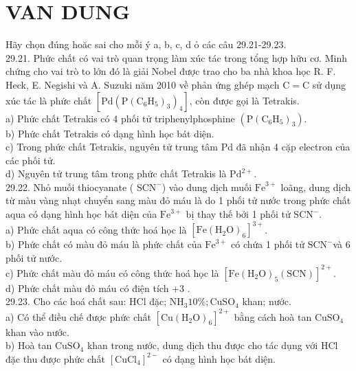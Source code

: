 \documentclass[10pt]{article}
\begin{document}
\section*{VAN DUNG}
Hãy chọn đúng hoăc sai cho mỗi ý a, b, c, d ỏ các câu 29.21-29.23.\\
29.21. Phức chất có vai trò quan trọng làm xúc tác trong tổng hợp hữu cơ. Minh chứng cho vai trò to lớn đó là giải Nobel được trao cho ba nhà khoa học R. F. Heck, E. Negishi và A. Suzuki năm 2010 về phản ứng ghép mạch $\mathrm{C}=\mathrm{C}$ sử dụng xúc tác là phức chất $\left[\mathrm{Pd}\left(\mathrm{P}\left(\mathrm{C}_{6} \mathrm{H}_{5}\right)_{3}\right)_{4}\right]$, còn được gọi là Tetrakis.\\
a) Phức chất Tetrakis có 4 phối tử triphenylphosphine $\left(\mathrm{P}\left(\mathrm{C}_{6} \mathrm{H}_{5}\right)_{3}\right)$.\\
b) Phức chất Tetrakis có dạng hình học bát diện.\\
c) Trong phức chất Tetrakis, nguyên tử trung tâm Pd đã nhận 4 cặp electron của các phối tử.\\
d) Nguyên tử trung tâm trong phức chất Tetrakis là $\mathrm{Pd}^{2+}$.\\
29.22. Nhỏ muối thiocyanate ( $\mathrm{SCN}^{-}$) vào dung dịch muối $\mathrm{Fe}^{3+}$ loãng, dung dịch từ màu vàng nhạt chuyển sang màu đỏ máu là do 1 phối tử nước trong phức chất aqua có dạng hình học bát diện của $\mathrm{Fe}^{3+}$ bị thay thế bởi 1 phối tử $\mathrm{SCN}^{-}$.\\
a) Phức chất aqua có công thức hoá học là $\left[\mathrm{Fe}\left(\mathrm{H}_{2} \mathrm{O}\right)_{6}\right]^{3+}$.\\
b) Phức chất có màu đỏ máu là phức chất của $\mathrm{Fe}^{3+}$ có chứa 1 phối tử $\mathrm{SCN}^{-}$và 6 phối tử nước.\\
c) Phức chất màu đỏ máu có công thức hoá học là $\left[\mathrm{Fe}\left(\mathrm{H}_{2} \mathrm{O}\right)_{5}(\mathrm{SCN})\right]^{2+}$.\\
d) Phức chất màu đỏ máu có điện tích +3 .\\
29.23. Cho các hoá chất sau: HCl đặc; $\mathrm{NH}_{3} 10 \% ; \mathrm{CuSO}_{4}$ khan; nước.\\
a) Có thể điều chế được phức chất $\left[\mathrm{Cu}\left(\mathrm{H}_{2} \mathrm{O}\right)_{6}\right]^{2+}$ bằng cách hoà tan $\mathrm{CuSO}_{4}$ khan vào nước.\\
b) Hoà tan $\mathrm{CuSO}_{4}$ khan trong nước, dung dịch thu được cho tác dụng với HCl đặc thu được phức chất $\left[\mathrm{CuCl}_{4}\right]^{2-}$ có dạng hình học bát diện.\\
\end{document}
